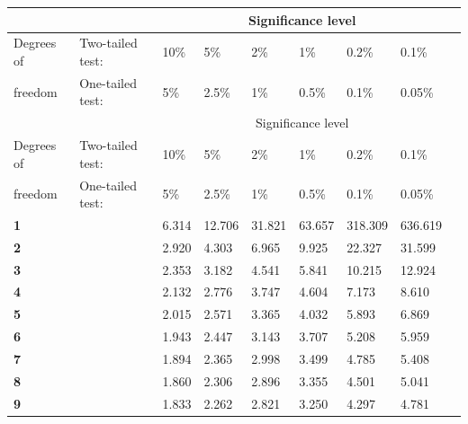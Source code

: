 \vspace{-0.5cm}
\renewcommand{\arraystretch}{1.3}
\begin{longtable}{|l|l l|l|l|l|l|l|l|}
    \hline
    \rowcolor{gray!30}
    &&\multicolumn{6}{c|}{Significance level} \\ \hline
    \rowcolor{gray!30}
    Degrees of & Two-tailed test: & 10\% & 5\% & 2\% & 1\% & 0.2\% & 0.1\%\\
    \rowcolor{gray!30}
    freedom & One-tailed test: & 5\% & 2.5\% & 1\% & 0.5\% & 0.1\% & 0.05\%\\ \hline
    \endfirsthead

    \hline
    \rowcolor{gray!30}
    &&\multicolumn{6}{c|}{Significance level} \\ \hline
    \rowcolor{gray!30}
    Degrees of & Two-tailed test: & 10\% & 5\% & 2\% & 1\% & 0.2\% & 0.1\%\\
    \rowcolor{gray!30}
    freedom & One-tailed test: & 5\% & 2.5\% & 1\% & 0.5\% & 0.1\% & 0.05\%\\ \hline
    \endhead

    \hline\endfoot
    \hline\endlastfoot
 
    \textbf{1} & & 6.314 & 12.706 & 31.821 & 63.657 & 318.309 & 636.619\\ \hline
    
    \textbf{2} & & 2.920 & 4.303 & 6.965 & 9.925 & 22.327 & 31.599\\ \hline
    
    \textbf{3} & & 2.353 & 3.182 & 4.541 & 5.841 & 10.215 & 12.924\\ \hline
    
    \textbf{4} & & 2.132 & 2.776 & 3.747 & 4.604 & 7.173 & 8.610\\ \hline
    
    \textbf{5} & & 2.015 & 2.571 & 3.365 & 4.032 & 5.893 & 6.869\\ \hline
    
    \textbf{6} & & 1.943 & 2.447 & 3.143 & 3.707 & 5.208 & 5.959\\ \hline
    
    \textbf{7} & & 1.894 & 2.365 & 2.998 & 3.499 & 4.785 & 5.408\\ \hline
    
    \textbf{8} & & 1.860 & 2.306 & 2.896 & 3.355 & 4.501 & 5.041\\ \hline
    
    \textbf{9} & & 1.833 & 2.262 & 2.821 & 3.250 & 4.297 & 4.781\\ \hline
    

\end{longtable}
